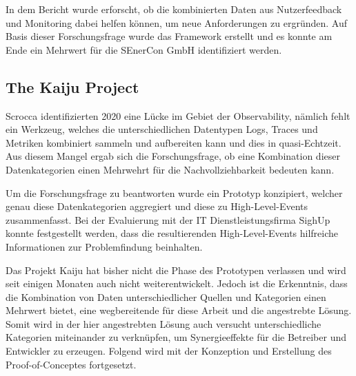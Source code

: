 
In dem Bericht wurde erforscht, ob die kombinierten Daten aus Nutzerfeedback und Monitoring dabei helfen können, um neue Anforderungen zu ergründen. Auf Basis dieser Forschungsfrage wurde das Framework erstellt und es konnte am Ende ein Mehrwert für die SEnerCon GmbH identifiziert werden.

\subsection{The Kaiju Project}
\label{sec:kaiju}

Scrocca \etal \cite{TheKaijuProjectPaper} identifizierten 2020 eine Lücke im Gebiet der Observability, nämlich fehlt ein Werkzeug, welches die unterschiedlichen Datentypen Logs, Traces und Metriken kombiniert sammeln und aufbereiten kann und dies in quasi-Echtzeit. Aus diesem Mangel ergab sich die Forschungsfrage, ob eine Kombination dieser Datenkategorien einen Mehrwehrt für die Nachvollziehbarkeit bedeuten kann.

Um die Forschungsfrage zu beantworten wurde ein Prototyp konzipiert, welcher genau diese Datenkategorien aggregiert und diese zu High-Level-Events zusammenfasst. Bei der Evaluierung mit der IT Dienstleistungsfirma SighUp konnte festgestellt werden, dass die resultierenden High-Level-Events hilfreiche Informationen zur Problemfindung beinhalten.

Das Projekt Kaiju hat bisher nicht die Phase des Prototypen verlassen und wird seit einigen Monaten auch nicht weiterentwickelt\footnotemark{}. Jedoch ist die Erkenntnis, dass die Kombination von Daten unterschiedlicher Quellen und Kategorien einen Mehrwert bietet, eine wegbereitende für diese Arbeit und die angestrebte Lösung. Somit wird in der hier angestrebten Lösung auch versucht unterschiedliche Kategorien miteinander zu verknüpfen, um Synergieeffekte für die Betreiber und Entwickler zu erzeugen. Folgend wird mit der Konzeption und Erstellung des Proof-of-Conceptes fortgesetzt.


